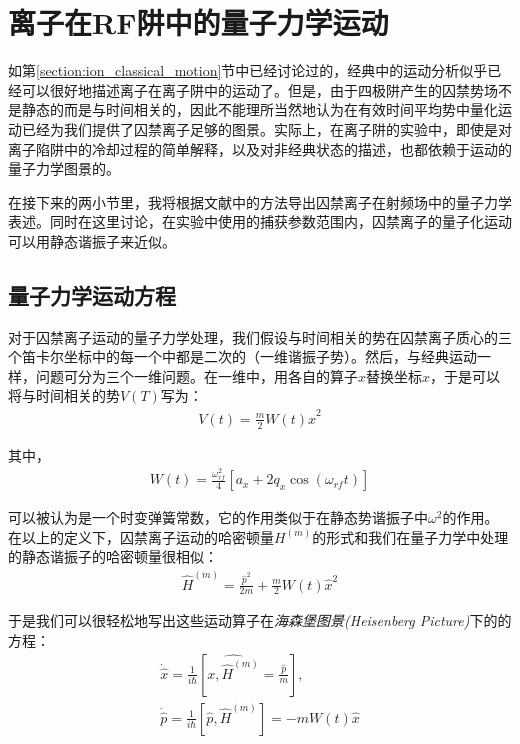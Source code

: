 \section[离子在RF阱中的量子力学运动]{离子在RF阱中的量子力学运动\label{section:quantum_motion}}

如第\ref{section:ion_classical_motion}节中已经讨论过的，经典中的运动分析似乎已经可以很好地描述离子在离子阱中的运动了。但是，由于四极阱产生的囚禁势场不是静态的而是与时间相关的，因此不能理所当然地认为在有效时间平均势中量化运动已经为我们提供了囚禁离子足够的图景。实际上，在离子阱的实验中，即使是对离子陷阱中的冷却过程的简单解释，以及对非经典状态的描述，也都依赖于运动的量子力学图景的。

在接下来的两小节里，我将根据文献\cite[]{Arimondo_Phillips_Strumia_1992}中的方法导出囚禁离子在射频场中的量子力学表述。同时在这里讨论，在实验中使用的捕获参数范围内，囚禁离子的量子化运动可以用静态谐振子来近似。

\subsection[量子力学运动方程]{量子力学运动方程}
对于囚禁离子运动的量子力学处理，我们假设与时间相关的势在囚禁离子质心的三个笛卡尔坐标中的每一个中都是二次的（一维谐振子势\cite[]{Solimeno_Di_Porto_Crosignani}）。然后，与经典运动一样，问题可分为三个一维问题。在一维中，用各自的算子$\hat{x}$替换坐标$x$，于是可以将与时间相关的势$V(T)$写为：
\begin{align}
    V(t)=\frac{m}{2}W(t)\hat{x}^2
\end{align}

其中，
\begin{align}
    W(t)=\frac{\omega_{rf}^2}{4}\left[a_x+2q_x\cos(\omega_{rf}t)\right]
\end{align}

可以被认为是一个时变弹簧常数，它的作用类似于在静态势谐振子中$\omega^2$的作用。在以上的定义下，囚禁离子运动的哈密顿量$H^{(m)}$的形式和我们在量子力学中处理的静态谐振子的哈密顿量很相似：
\begin{align}
    \hat{H}^{(m)}=\frac{\hat{p}^2}{2m}+\frac{m}{2}W(t)\hat{x}^2
\end{align}

于是我们可以很轻松地写出这些运动算子在\emph{海森堡图景(Heisenberg Picture)}下的的方程：
\begin{align}
    \dot{\hat{x}}= \frac{1}{i\hbar}\left[\hat{x,\hat{H}^{(m)}}=\frac{\hat{p}}{m}\right],\\
    \dot{\hat{p}}= \frac{1}{i\hbar}\left[\hat{p},\hat{H}^{(m)}\right]=-mW(t)\hat{x}
\end{align}

